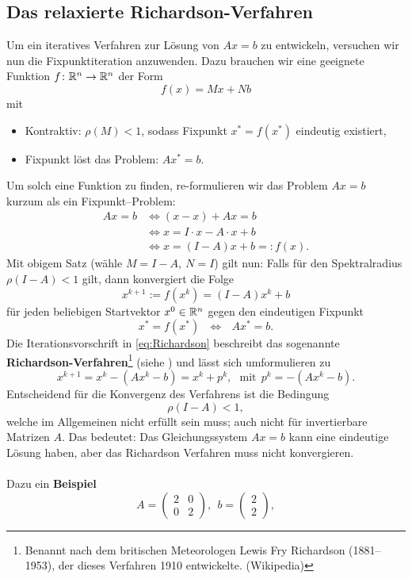 \subsection{Das relaxierte Richardson-Verfahren}
Um ein iteratives Verfahren zur Lösung von $Ax=b$ zu entwickeln, versuchen wir nun die Fixpunktiteration anzuwenden. Dazu brauchen wir eine geeignete Funktion $f\colon {\mathbb{R}}^{n} \to {\mathbb{R}}^{n}$ der Form $$f(x) = Mx+Nb$$ mit
\begin{itemize}
	\item Kontraktiv: $\rho(M)<1$, sodass Fixpunkt $x^* = f(x^*)$ eindeutig existiert,
	\item Fixpunkt löst das Problem: $Ax^* = b$.
\end{itemize}
Um solch eine Funktion zu finden, re-formulieren wir das Problem $Ax=b$ kurzum als ein Fixpunkt--Problem:
\begin{align*}
Ax = b  &\Leftrightarrow (x-x) + Ax = b \\
&\Leftrightarrow x = I\cdot x - A \cdot x + b\\
 &\Leftrightarrow x = (I-A)x + b =: f(x).
\end{align*}
Mit obigem Satz (wähle $M=I-A,~ N=I$) gilt nun: Falls für den Spektralradius $\rho(I-A)<1$ gilt, dann konvergiert die Folge
\begin{equation} \label{eq:Richardson}
 x^{k+1} := f(x^k) = (I-A)x^k + b
\end{equation}
für jeden beliebigen Startvektor $x^0 \in {\mathbb{R}}^{n}$ gegen den eindeutigen Fixpunkt
$$x^* = f(x^*) ~~~\Leftrightarrow~~~Ax^* = b. $$
Die Iterationsvorschrift in \eqref{eq:Richardson} beschreibt das sogenannte \textbf{Richardson-Verfahren}\footnote{Benannt nach dem britischen Meteorologen Lewis Fry Richardson (1881--1953), der dieses Verfahren 1910 entwickelte. (Wikipedia)} (siehe \cite[Kap. 4.1.4]{Meister}) und lässt sich umformulieren zu
\begin{equation*}
x^{k+1} = x^k - (Ax^k - b) = x^k + p^k, ~~~\text{mit}~~p^k = - (Ax^k - b).
\end{equation*}
Entscheidend für die Konvergenz des Verfahrens ist die Bedingung
$$\rho(I-A)<1,$$
welche im Allgemeinen nicht erfüllt sein muss; auch nicht für invertierbare Matrizen $A$. Das bedeutet: Das Gleichungssystem $Ax=b$ kann eine eindeutige Lösung haben, aber das Richardson Verfahren muss nicht konvergieren.\\~\\
Dazu ein \textbf{Beispiel}
$$A = \begin{pmatrix}2&0\\0&2\end{pmatrix},~~b = \begin{pmatrix}2\\2\end{pmatrix}, $$
